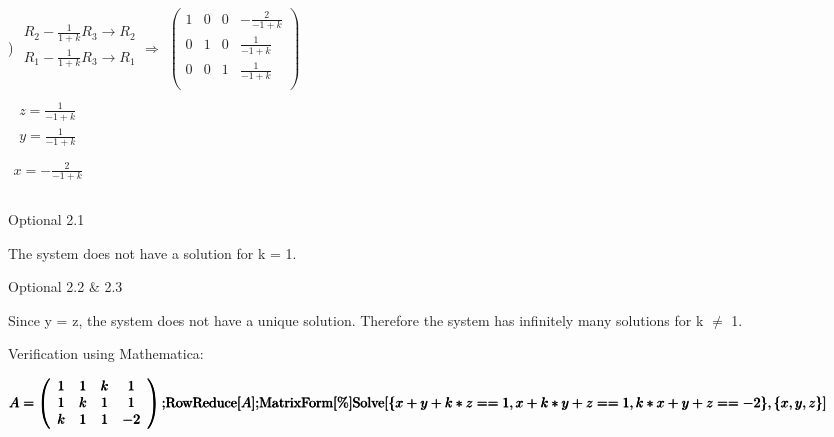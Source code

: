 \documentclass[11pt,a4paper]{article}
\begin{document}
\right)\Rightarrow\) \(\begin{array}{c}
 R_2-\frac{1}{1+k}R_3\rightarrow R_2 \\
 R_1-\frac{1}{1+k}R_3\rightarrow R_1 \\
\end{array}
\Rightarrow\) \(\left(
\begin{array}{cccc}
 1 & 0 & 0 & -\frac{2}{-1+k} \\
 0 & 1 & 0 & \frac{1}{-1+k} \\
 0 & 0 & 1 & \frac{1}{-1+k} \\
\end{array}
\right)\)\\
\(\begin{array}{c}\\
 
\begin{array}{c}
 z=\frac{1}{-1+k} \\
 y=\frac{1}{-1+k} \\
\end{array}
 \\
 x=-\frac{2}{-1+k} \\
\end{array}\)\\
\\

Optional 2.1
\begin{mdframed}
The system does not have a solution for k = 1.\\
\end{mdframed}

Optional 2.2 $\&$ 2.3
\begin{mdframed}
Since y = z, the system does not have a unique solution. Therefore the system has infinitely many solutions for k $\neq $ 1.
\end{mdframed}

Verification using Mathematica:

\begin{doublespace}
\noindent\(\pmb{A=\left(
\begin{array}{cccc}
 1 & 1 & k & 1 \\
 1 & k & 1 & 1 \\
 k & 1 & 1 & -2 \\
\end{array}
\right);}\\
\pmb{\text{RowReduce}[A];}\\
\pmb{\text{MatrixForm}[\%]}\\
\pmb{\text{Solve}[\{x+y+k*z==1,x+k*y+z==1,k*x+y+z==-2\},\{x,y,z\}]}\)
\end{doublespace}
\end{document}
